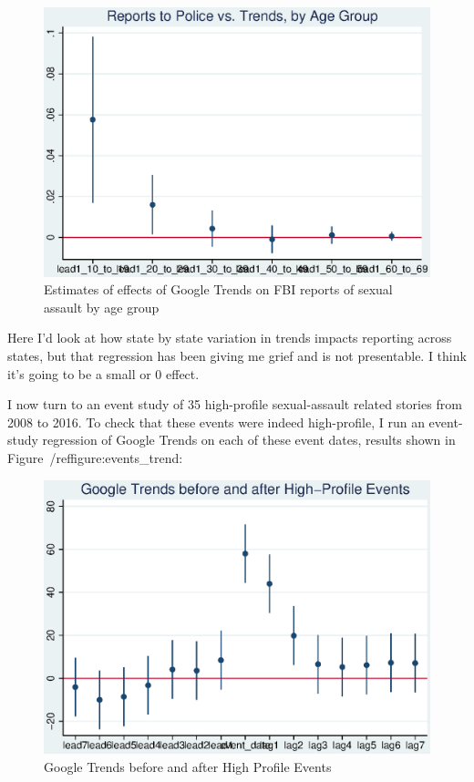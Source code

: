 \documentclass[AER,draftmode]{AEA}
\begin{document}
\begin{figure}
\includegraphics[]{figures/police_trend_daily_agegroup.eps}
\caption{Estimates of effects of Google Trends on FBI reports of sexual assault by age group} \label{figure:police_trends_daily_by_age}
\end{figure}


Here I'd look at how state by state variation in trends impacts reporting across states, but that regression has been giving me grief and is not presentable. I think it's going to be a small or 0 effect.

I now turn to an event study of 35 high-profile sexual-assault related stories from 2008 to 2016. To check that these events were indeed high-profile, I run an event-study regression of Google Trends on each of these event dates, results shown in Figure~/ref{figure:events_trend}:

\begin{figure}
\includegraphics[]{figures/events_trend.eps}
\caption{Google Trends before and after High Profile Events} \label{figure:events_trend}
\end{figure}
\end{document}
